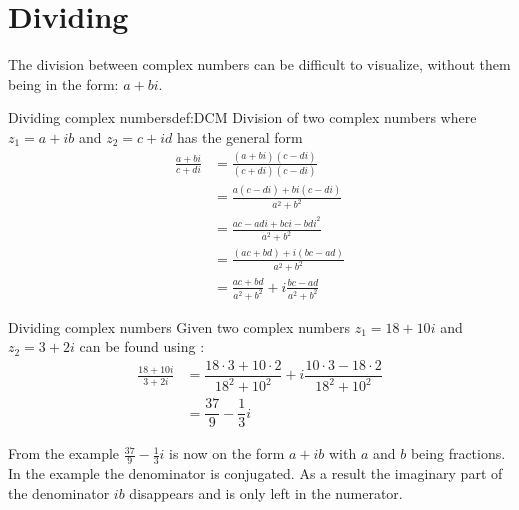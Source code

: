 \section{Dividing}
The division between complex numbers can be difficult to visualize, without them being in the form: $a + bi$. 
\begin{definition}{Dividing complex numbers}{def:DCM}
Division of two complex numbers where $z_1=a+ib$ and $z_2=c+id$ has the general form
\begin{align*}
\frac{a + bi}{c + di} 										
&= \frac{(a+bi)(c-di)}{(c+di)(c-di)} 						\\[1em]
&= \frac{a(c-di)+bi(c-di)}{a^2+b^2} 							\\[1em]
&= \frac{ac-adi+bci-bdi^2}{a^2+b^2}							\\[1em]
&= \frac{(ac+bd)+i(bc-ad)}{a^2+b^2}							\\[1em]
&= \frac{ac+bd}{a^2+b^2}+i \frac{bc-ad}{a^2+b^2}				
\end{align*}
\end{definition}
\begin{example}{Dividing complex numbers}{}
Given two complex numbers $z_1=18+10i$ and $z_2=3+2i$ can be found using :
\begin{align*}
\frac{18 + 10i}{3 + 2i} &= \dfrac{18\cdot3+10\cdot2}{18^2+10^2}+i\dfrac{10\cdot3-18\cdot2}{18^2+10^2}
\\
&=\dfrac{37}{9}-\dfrac{1}{3}i
\end{align*}
\end{example}


From the example $\frac{37}{9} - \frac{1}{3}i$ is now on the form $a+ib$ with $a$ and $b$ being fractions. In the example the denominator is conjugated. As a result the imaginary part of the denominator $ib$ disappears and is only left in the numerator. 
